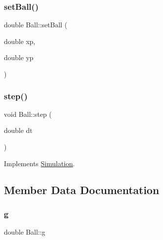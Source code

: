 \mbox{\label{classBall_a5de2a9c31906ebd899e51c6ddca7ef3a}} 
\subsubsection{\texorpdfstring{set\+Ball()}{setBall()}}
{\footnotesize\ttfamily double Ball\+::set\+Ball (\begin{DoxyParamCaption}\item[{double}]{xp,  }\item[{double}]{yp }\end{DoxyParamCaption})}

\mbox{\label{classBall_a92dc65e1ed710ff01a4cbbb591ad7cb3}} 
\subsubsection{\texorpdfstring{step()}{step()}}
{\footnotesize\ttfamily void Ball\+::step (\begin{DoxyParamCaption}\item[{double}]{dt }\end{DoxyParamCaption})\hspace{0.3cm}{\ttfamily [virtual]}}



Implements \hyperlink{classSimulation_a1040e261c063e307871fb1dfe664fb0a}{Simulation}.



\subsection{Member Data Documentation}
\mbox{\label{classBall_a3573a38b1d3bac62a0bdf7060632bf98}} 
\subsubsection{\texorpdfstring{g}{g}}
{\footnotesize\ttfamily double Ball\+::g\hspace{0.3cm}{\ttfamily [protected]}}

\mbox{\label{classBall_a78ecb2a76fb573ad0411b040dfc84e9d}} 

